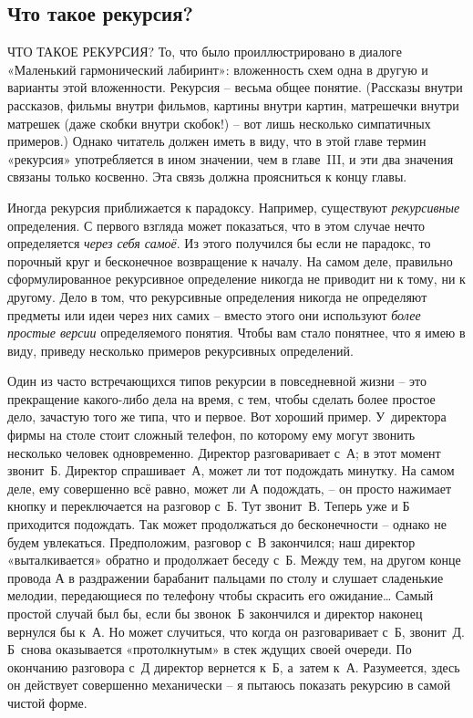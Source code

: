 \documentclass[../main.tex]{subfiles}
\begin{document}

\subsection{Что такое рекурсия?}

ЧТО ТАКОЕ РЕКУРСИЯ? То, что было проиллюстрировано в диалоге «Маленький гармонический лабиринт»: вложенность схем одна в другую и варианты этой вложенности. Рекурсия \--- весьма общее понятие. (Рассказы внутри рассказов, фильмы внутри фильмов, картины внутри картин, матрешечки внутри матрешек (даже скобки внутри скобок!) \--- вот лишь несколько симпатичных примеров.) Однако читатель должен иметь в виду, что в этой главе термин «рекурсия» употребляется в ином значении, чем в главе~III, и эти два значения связаны только косвенно. Эта связь должна проясниться к концу главы.

Иногда рекурсия приближается к парадоксу. Например, существуют \emph{рекурсивные} определения. С первого взгляда может показаться, что в этом случае нечто определяется \emph{через себя самоё}. Из этого получился бы если не парадокс, то порочный круг и бесконечное возвращение к началу. На самом деле, правильно сформулированное рекурсивное определение никогда не приводит ни к тому, ни к другому. Дело в том, что рекурсивные определения никогда не определяют предметы или идеи через них самих \--- вместо этого они используют \emph{более простые версии} определяемого понятия. Чтобы вам стало понятнее, что я имею в виду, приведу несколько примеров рекурсивных определений.

Один из часто встречающихся типов рекурсии в повседневной жизни \--- это прекращение какого-либо дела на время, с тем, чтобы сделать более простое дело, зачастую того же типа, что и первое. Вот хороший пример. У~директора фирмы на столе стоит сложный телефон, по которому ему могут звонить несколько человек одновременно. Директор разговаривает с~А; в этот момент звонит~Б\@. Директор спрашивает~А, может ли тот подождать минутку. На самом деле, ему совершенно всё равно, может ли А подождать, \--- он просто нажимает кнопку и переключается на разговор с~Б\@. Тут звонит~В\@. Теперь уже и Б приходится подождать. Так может продолжаться до бесконечности \--- однако не будем увлекаться. Предположим, разговор с~В закончился; наш директор «выталкивается» обратно и продолжает беседу с~Б\@. Между тем, на другом конце провода А в раздражении барабанит пальцами по столу и слушает сладенькие мелодии, передающиеся по телефону чтобы скрасить его ожидание\ldots{} Самый простой случай был бы, если бы звонок~Б закончился и директор наконец вернулся бы к~А\@. Но может случиться, что когда он разговаривает с~Б, звонит~Д\@. Б~снова оказывается «протолкнутым» в стек ждущих своей очереди. По окончанию разговора с~Д директор вернется к~Б, а~затем к~А\@. Разумеется, здесь он действует совершенно механически \--- я пытаюсь показать рекурсию в самой чистой форме.
\end{document}
